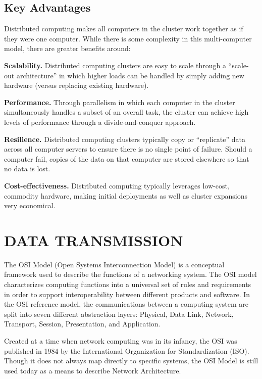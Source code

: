 \documentclass[../report.tex]{subfiles}
\begin{document}
\subsection{Key Advantages}

Distributed computing makes all computers in the cluster work together as if they were one computer. While there is some complexity in this multi-computer model, there are greater benefits around:

\textbf{Scalability.} Distributed computing clusters are easy to scale through a “scale-out architecture” in which higher loads can be handled by simply adding new hardware (versus replacing existing hardware).

\textbf{Performance.} Through parallelism in which each computer in the cluster simultaneously handles a subset of an overall task, the cluster can achieve high levels of performance through a divide-and-conquer approach.

\textbf{Resilience.} Distributed computing clusters typically copy or “replicate” data across all computer servers to ensure there is no single point of failure. Should a computer fail, copies of the data on that computer are stored elsewhere so that no data is lost.

\textbf{Cost-effectiveness.} Distributed computing typically leverages low-cost, commodity hardware, making initial deployments as well as cluster expansions very economical.


\section{DATA TRANSMISSION} %

The OSI Model (Open Systems Interconnection Model) is a conceptual framework used to describe the functions of a networking system. The OSI model characterizes computing functions into a universal set of rules and requirements in order to support interoperability between different products and software. In the OSI reference model, the communications between a computing system are split into seven different abstraction layers: Physical, Data Link, Network, Transport, Session, Presentation, and Application.

Created at a time when network computing was in its infancy, the OSI was published in 1984 by the International Organization for Standardization (ISO). Though it does not always map directly to specific systems, the OSI Model is still used today as a means to describe Network Architecture.
\end{document}
